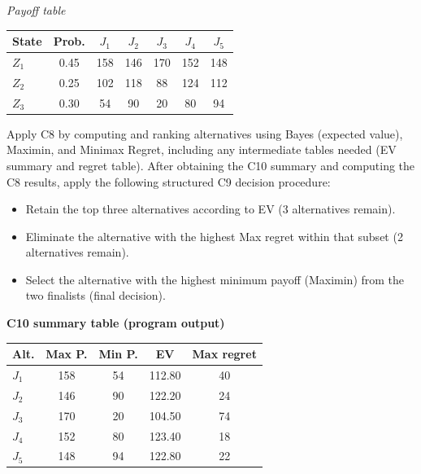 \begin{ExamProblems}
		\begin{center}
			\textit{Payoff table} \\
			\begin{tabular}{l c c c c c c}
				\hline
				State& Prob. & $J_1$ & $J_2$ & $J_3$ & $J_4$ & $J_5$ \\
				\hline
				$Z_1$ & 0.45 & 158 & 146 & 170 & 152 & 148 \\
				$Z_2$ & 0.25 & 102 & 118 & 88 & 124 & 112 \\
				$Z_3$ & 0.30 & 54 & 90 & 20 & 80 & 94 \\
				\hline
			\end{tabular}
		\end{center}
		
		Apply C8 by computing and ranking alternatives using Bayes (expected value), Maximin, and Minimax Regret, including any intermediate tables needed (EV summary and regret table).
		After obtaining the C10 summary and computing the C8 results, apply the following structured C9 decision procedure:
		\begin{itemize}
			\item Retain the top three alternatives according to EV (3 alternatives remain).
			\item Eliminate the alternative with the highest Max regret within that subset (2 alternatives remain).
			\item Select the alternative with the highest minimum payoff (Maximin) from the two finalists (final decision).
		\end{itemize}
		
		\vspace{0.25cm}
		
		\textbf{C10 summary table (program output)}\par
		\begin{center}
			\begin{tabular}{l c c c c}
				\hline
				Alt. & Max P. & Min P. & EV & Max regret \\
				\hline
				$J_1$ & 158 & 54 & 112.80 & 40 \\
				$J_2$ & 146 & 90 & 122.20 & 24 \\
				$J_3$ & 170 & 20 & 104.50 & 74 \\
				$J_4$ & 152 & 80 & 123.40 & 18 \\
				$J_5$ & 148 & 94 & 122.80 & 22 \\
				\hline
			\end{tabular}
		\end{center}
		

\end{ExamProblems}
